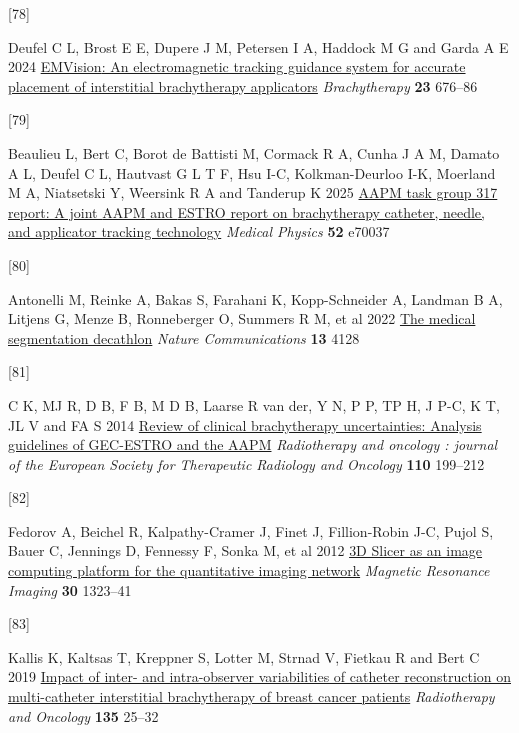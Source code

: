 \documentclass[
  11pt,
]{article}
\newlength{\cslhangindent}
\newlength{\csllabelwidth}
\newenvironment{CSLReferences}[2] %
 {\begin{list}{}{%
  \setlength{\itemindent}{0pt}
  \setlength{\leftmargin}{0pt}
  \setlength{\parsep}{0pt}
  \ifodd #1
   \setlength{\leftmargin}{\cslhangindent}
   \setlength{\itemindent}{-1\cslhangindent}
  \fi
  \setlength{\itemsep}{#2\baselineskip}}}
 {\end{list}}
\newcommand{\CSLLeftMargin}[1]{\parbox[t]{\csllabelwidth}{\strut#1\strut}}
\newcommand{\CSLRightInline}[1]{\parbox[t]{\linewidth - \csllabelwidth}{\strut#1\strut}}
\begin{document}
\begin{CSLReferences}{0}{1}
\CSLLeftMargin{{[}78{]} }%
\CSLRightInline{Deufel C L, Brost E E, Dupere J M, Petersen I A, Haddock
M G and Garda A E 2024
\href{https://doi.org/10.1016/j.brachy.2024.06.006}{{EMVision}: An
electromagnetic tracking guidance system for accurate placement of
interstitial brachytherapy applicators} \emph{Brachytherapy} \textbf{23}
676--86}

\CSLLeftMargin{{[}79{]} }%
\CSLRightInline{Beaulieu L, Bert C, Borot de Battisti M, Cormack R A,
Cunha J A M, Damato A L, Deufel C L, Hautvast G L T F, Hsu I-C,
Kolkman-Deurloo I-K, Moerland M A, Niatsetski Y, Weersink R A and
Tanderup K 2025 \href{https://doi.org/10.1002/mp.70037}{{AAPM} task
group 317 report: A joint {AAPM} and {ESTRO} report on brachytherapy
catheter, needle, and applicator tracking technology} \emph{Medical
Physics} \textbf{52} e70037}

\CSLLeftMargin{{[}80{]} }%
\CSLRightInline{Antonelli M, Reinke A, Bakas S, Farahani K,
Kopp-Schneider A, Landman B A, Litjens G, Menze B, Ronneberger O,
Summers R M, et al 2022
\href{https://doi.org/10.1038/s41467-022-30695-9}{The medical
segmentation decathlon} \emph{Nature Communications} \textbf{13} 4128}

\CSLLeftMargin{{[}81{]} }%
\CSLRightInline{C K, MJ R, D B, F B, M D B, Laarse R van der, Y N, P P,
TP H, J P-C, K T, JL V and FA S 2014
\href{https://doi.org/10.1016/j.radonc.2013.11.002}{Review of clinical
brachytherapy uncertainties: Analysis guidelines of GEC-ESTRO and the
AAPM} \emph{Radiotherapy and oncology : journal of the European Society
for Therapeutic Radiology and Oncology} \textbf{110} 199--212}

\CSLLeftMargin{{[}82{]} }%
\CSLRightInline{Fedorov A, Beichel R, Kalpathy-Cramer J, Finet J,
Fillion-Robin J-C, Pujol S, Bauer C, Jennings D, Fennessy F, Sonka M, et
al 2012 \href{https://doi.org/10.1016/j.mri.2012.05.001}{{3D Slicer} as
an image computing platform for the quantitative imaging network}
\emph{Magnetic Resonance Imaging} \textbf{30} 1323--41}

\CSLLeftMargin{{[}83{]} }%
\CSLRightInline{Kallis K, Kaltsas T, Kreppner S, Lotter M, Strnad V,
Fietkau R and Bert C 2019
\href{https://doi.org/10.1016/j.radonc.2019.02.017}{Impact of inter- and
intra-observer variabilities of catheter reconstruction on
multi-catheter interstitial brachytherapy of breast cancer patients}
\emph{Radiotherapy and Oncology} \textbf{135} 25--32}


\end{CSLReferences}
\end{document}
